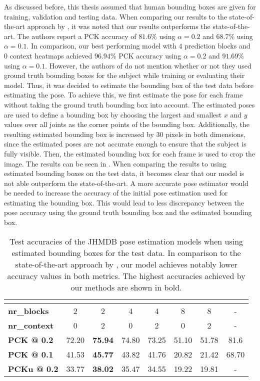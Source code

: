 As discussed before, this thesis assumed that human bounding boxes are given for training, validation and testing data.
When comparing our results to the state-of-the-art approach by \cite{song_thin-slicing_2017}, it was noted that our results outperforms the state-of-the-art.
The authors report a PCK accuracy of $81.6\%$ using $\alpha = 0.2$ and $68.7\%$ using $\alpha = 0.1$.
In comparison, our best performing model with $4$ prediction blocks and $0$ context heatmaps achieved $96.94\%$ PCK accuracy using $\alpha = 0.2$ and $91.69\%$ using $\alpha = 0.1$.
However, the authors of \cite{song_thin-slicing_2017} do not mention whether or not they used ground truth bounding boxes for the subject while training or evaluating their model.
Thus, it was decided to estimate the bounding box of the test data before estimating the pose.
To achieve this, we first estimate the pose for each frame without taking the ground truth bounding box into account.
The estimated poses are used to define a bounding box by choosing the largest and smallest $x$ and $y$ values over all joints as the corner points of the bounding box.
Additionally, the resulting estimated bounding box is increased by $30$ pixels in both dimensions, since the estimated poses are not accurate enough to ensure that the subject is fully visible.
Then, the estimated bounding box for each frame is used to crop the image.
The results can be seen in .
When comparing the results to \cite{song_thin-slicing_2017} using estimated bounding boxes on the test data, it becomes clear that our model is not able outperform the state-of-the-art.
A more accurate pose estimator would be needed to increase the accuracy of the initial pose estimation used for estimating the bounding box.
This would lead to less discrepancy between the pose accuracy using the ground truth bounding box and the estimated bounding box.

\begin{table}[]
    \small
    \centering
    \begin{tabular}{|l|c|c|c|c|c|c|c|}
    \hline
         & & & & & & & \cite{song_thin-slicing_2017} \\ \hline
        \textbf{nr\_blocks} & 2 & 2 & 4 & 4 & 8 & 8 & -\\ \hline
        \textbf{nr\_context} & 0 & 2 & 0 & 2 & 0 & 2 & -\\ \hline
        \textbf{PCK @ 0.2} & 72.20 & \textbf{75.94} & 74.80 & 73.25 & 51.10 & 51.78 & 81.6 \\ \hline
        \textbf{PCK @ 0.1} & 41.53 & \textbf{45.77} & 43.82 & 41.76 & 20.82 & 21.42 & 68.70 \\ \hline
        \textbf{PCKu @ 0.2} & 33.77 & \textbf{38.02} & 35.47 & 34.55 & 19.22 & 19.81 & -\\ \hline
    \end{tabular}
    \caption{Test accuracies of the JHMDB pose estimation models when using estimated bounding boxes for the test data. In comparison to the state-of-the-art approach by \cite{song_thin-slicing_2017}, our model achieves notably lower accuracy values in both metrics. The highest accuracies achieved by our methods are shown in bold.}
    \label{tab:jhmdb_results_estimated}
\end{table}

